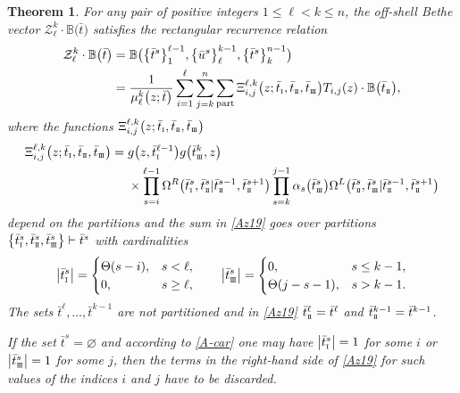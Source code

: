 \documentclass[10pt,a4paper]{amsart}
\newcommand{\so}{\scriptscriptstyle \rm I}
\newcommand{\st}{\scriptscriptstyle \rm I\hspace{-1pt}I}
\newcommand{\sth}{\scriptscriptstyle \rm I\hspace{-1pt}I\hspace{-1pt}I}
\newcommand{\bu}{\bar u}
\newcommand{\bt}{{\bar t}}
\newtheorem{thm}{Theorem}[section]
\theoremstyle{definition}
\def\BB{{\mathbb{B}}}
\def\r#1{\eqref{#1}}
\def\Z{\mathcal{Z}}
\def\Oml{\Omega^L}
\def\Omr{\Omega^R}
\begin{document}
\begin{thm}\label{rec-pr}
For any pair of positive integers $1\leq \ell< k\leq n$, the off-shell
Bethe vector
$\Z_\ell^{k}\cdot \BB\bigl(\bt\bigr)$ satisfies the
{\it rectangular} recurrence relation
\begin{align}
\Z_\ell^{k}\cdot \BB\bigl(\bt\bigr)&=
\BB\bigl(\bigl\{\bt^s\bigr\}_1^{\ell-1},\bigl\{\bu^{s}\bigr\}_\ell^{k-1},\bigl\{\bt^s\bigr\}_k^{n-1}\bigr)\nonumber\\
&=\frac{1}{\mu^k_\ell\bigl(z;\bt\bigr)}
\sum_{i=1}^\ell\sum_{j=k}^n \sum_{\rm part}
 \Xi^{\ell,k}_{i,j}\bigl(z;\bt_{\so},\bt_{\st},\bt_{\sth}\bigr)
T_{i,j}(z)\cdot\BB\bigl(\bt_{\st}\bigr) ,\label{Az19}
\end{align}
where the functions $\Xi^{\ell,k}_{i,j}\bigl(z;\bt_{\so},\bt_{\st},\bt_{\sth}\bigr)$
\begin{align}
\Xi^{\ell,k}_{i,j}\bigl(z;\bt_{\so},\bt_{\st},\bt_{\sth}\bigr)={}&
g\bigl(z, \bt^{\ell-1}_{\so}\bigr) g\bigl(\bt^k_{\sth}, z\bigr)\nonumber\\
&\times
\prod_{s=i}^{\ell-1}\Omr\bigl(\bt^s_{\so},\bt^s_{\st}|\bt^{s-1}_{\st},\bt^{s+1}_{\st}\bigr)
\prod_{s=k}^{j-1}\alpha_s\bigl(\bt^s_{\sth}\bigr)
\Oml\bigl(\bt^s_{\st},\bt^s_{\sth}|\bt^{s-1}_{\st},\bt^{s+1}_{\st}\bigr)\label{A-X-f}
\end{align}
depend on the partitions and
the sum in \r{Az19} goes over partitions
$ \bigl\{\bt^s_{\so},\bt^s_{\st},
\bt^s_{\sth}\bigr\}\vdash \bt^s$
with cardinalities
\begin{equation}\label{A-car}
\big|\bt^s_{\so}\big|=\begin{cases}\Theta(s-i),&s<\ell,\\0,&s\geq \ell,\end{cases}
\qquad
\big|\bt^s_{\sth}\big|=\begin{cases}0,&s\leq k-1,\\
\Theta(j-s-1), &s>k-1.\end{cases}
\end{equation}
 The sets $\bt^\ell,\dots,\bt^{k-1}$ are not partitioned
and in \r{Az19} $\bt^\ell_{\st}=\bt^\ell$ and $\bt^{k-1}_{\st}=\bt^{k-1}$.

If the set $\bt^s = \varnothing$ and according to
\r{A-car} one may have $\big|\bt^s_{\so}\big| = 1$ for some $i$ or
$\big|\bt^s_{\sth}\big| = 1$ for some $j$,
then the terms in the right-hand side
of \r{Az19} for such values of the indices $i$ and $j$ have to be discarded.
\end{thm}
\end{document}
